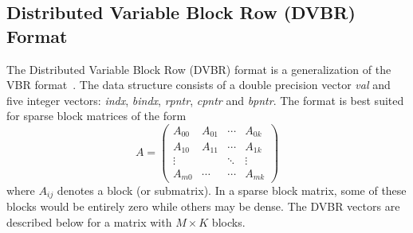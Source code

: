 \subsection{Distributed Variable Block Row (DVBR) Format} \label{DVBR Format}

The Distributed Variable Block Row (DVBR) format is a generalization of the VBR
format~\cite{sparker2}.  The data structure consists of a double precision
vector {\it val\/} and five integer vectors: {\it indx\/}, {\it bindx\/}, {\it
  rpntr\/}, {\it cpntr\/} and {\it bpntr\/}.  The format is best suited for
sparse block matrices of the form
\[
A = \left( \begin{array}{cccc}
        A_{00} & A_{01} & \cdots & A_{0k} \\
        A_{10} & A_{11} & \cdots & A_{1k} \\
        \vdots & & \ddots & \vdots \\
        A_{m0} & \cdots & \cdots & A_{mk} \end{array}
\right)
\]
where $A_{ij}$ denotes a block (or submatrix). In a sparse block matrix, some
of these blocks would be entirely zero while others may be dense. The DVBR
vectors are described below for a matrix with $M \times K$ blocks.
%
\vspace{1em}
